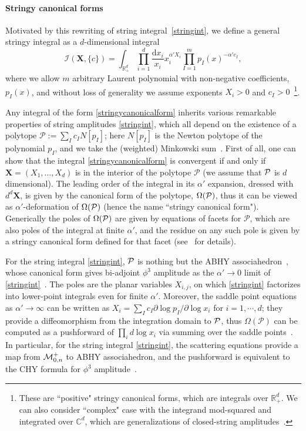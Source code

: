 \documentclass[hidelinks,12pt]{article}
\begin{document}
\paragraph{Stringy canonical forms} Motivated by this rewriting of string integral~\eqref{stringint}, we define a general stringy integral as a $d$-dimensional integral~\cite{}
\begin{equation}\label{stringycanonicalform}
	\mathcal I (\mathbf X,\{c\})=
	\int_{\mathbb R_+^d}\prod_{i=1}^d \frac{\mathrm d x_i}{x_i}x_i^{\alpha'X_i}
	\prod_{I=1}^m p_I(x)^{-\alpha' c_I},
\end{equation}
where we allow $m$ arbitrary Laurent polynomial with non-negative coefficients, $p_I(x)$, and without loss of generality we assume exponents $X_i>0$ and $c_I>0$~\footnote{These are ``positive" stringy canonical forms, which are integrals over $\mathbb R_+^d$. We can also consider ``complex" case with the integrand mod-squared and integrated over $\mathbb C^d$, which are generalizations of closed-string amplitudes~\cite{}.}. 

Any integral of the form \eqref{stringycanonicalform} inherits various remarkable properties of string amplitudes \eqref{stringint}, which all depend on the existence of a polytope $\mathcal P:=\sum_I c_I N[p_I]$; here $N[p_I]$ is the Newton polytope of the polynomial $p_I$, and we take the (weighted) Minkowski sum~\cite{}. First of all, one can show that the integral \eqref{stringycanonicalform} is convergent if and only if $\mathbf X=(X_1,\dots,X_d)$ is in the interior of the polytope $\mathcal P$ (we assume that ${\cal P}$ is $d$ dimensional). The leading order of the integral in its $\alpha'$ expansion, dressed with $d^d \mathbf X$, is given by the canonical form of the polytope, ${\Omega}(\cal P)$, thus it can be viewed as $\alpha'$-deformation of $\Omega(\cal P)$ (hence the name ``stringy canonical form"). Generically the poles of $\Omega(\cal P)$ are given by equations of
facets for $\mathcal P$, which are also poles of the integral at finite $\alpha'$, and the residue on any such pole is given by a stringy canonical form defined for that facet (see~\cite{} for details). 

For the string integral \eqref{stringint}, ${\cal P}$ is nothing but the ABHY associahedron~\cite{}, whose canonical form gives bi-adjoint $\phi^3$ amplitude as the $\alpha'\to 0$ limit of \eqref{stringint}~\cite{}. The poles are the planar variables $X_{i,j}$, on which \eqref{stringint} factorizes into lower-point integrals even for finite $\alpha'$. Moreover, the saddle point equations as $\alpha' \to \infty$ can be written as $X_i=\sum_I c_I \partial \log p_I/\partial \log x_i$ for $i=1,\cdots, d$; they provide a diffeomorphism from the integration domain to ${\cal P}$, thus $\Omega(\mathcal P)$ can be computed as a pushforward of $\prod_i d\log x_i$ via summing over the saddle points~\cite{}. In particular, for the string integral \eqref{stringint}, the scattering equations provide a map from ${\cal M}_{0,n}^+$ to ABHY associahedron, and the pushforward is equivalent to the CHY formula for $\phi^3$ amplitude~\cite{}. 
\end{document}
